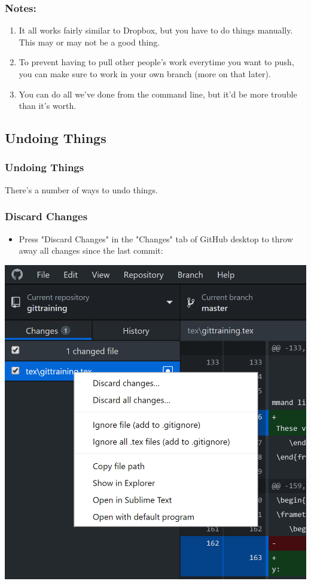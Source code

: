 \documentclass{beamer}
\begin{document}
\begin{frame}
	\frametitle{Notes:}
	\begin{enumerate}
		\item It all works fairly similar to Dropbox, but you have to do things manually. This may or may not be a good thing.
		\item To prevent having to pull other people's work everytime you want to push, you can make sure to work in your own branch (more on that later).
		\item You can do all we've done from the command line, but it'd be more trouble than it's worth.
	\end{enumerate}
\end{frame}

\subsection{Undoing Things}

\begin{frame}
\frametitle{Undoing Things}
There's a number of ways to undo things.
\end{frame}

\begin{frame}
	\frametitle{Discard Changes}
	\begin{itemize}
		\item Press "Discard Changes" in the "Changes" tab of GitHub desktop to throw away all changes since the last commit:
	\end{itemize}
	\hfill\includegraphics[width=0.6\linewidth]{figures/DiscardChanges.png}\hfill\strut


\end{frame}
\end{document}
